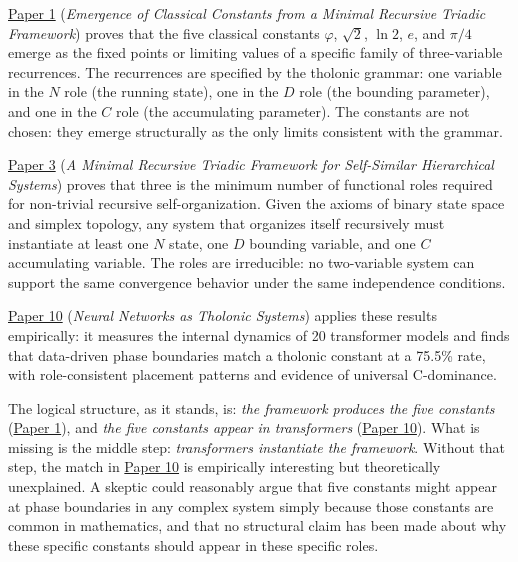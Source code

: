 \documentclass[
  11pt,
  letterpaper,
]{article}
\begin{document}
\href{https://github.com/baardev/truevalue/blob/main/docnav/Research/papers/1_recursive-tholonic-five-constants/1_recursive-tholonic-five-constants.pdf}{Paper
1} (\emph{Emergence of Classical Constants from a Minimal Recursive
Triadic Framework}) proves that the five classical constants
\(\varphi\), \(\sqrt{2}\), \(\ln 2\), \(e\), and \(\pi/4\) emerge as the
fixed points or limiting values of a specific family of three-variable
recurrences. The recurrences are specified by the tholonic grammar: one
variable in the \(N\) role (the running state), one in the \(D\) role
(the bounding parameter), and one in the \(C\) role (the accumulating
parameter). The constants are not chosen: they emerge structurally as
the only limits consistent with the grammar.

\href{https://github.com/baardev/truevalue/blob/main/docnav/Research/papers/3_minimal-recursive-triadic-framework/3_minimal-recursive-triadic-framework.pdf}{Paper
3} (\emph{A Minimal Recursive Triadic Framework for Self-Similar
Hierarchical Systems}) proves that three is the minimum number of
functional roles required for non-trivial recursive self-organization.
Given the axioms of binary state space and simplex topology, any system
that organizes itself recursively must instantiate at least one \(N\)
state, one \(D\) bounding variable, and one \(C\) accumulating variable.
The roles are irreducible: no two-variable system can support the same
convergence behavior under the same independence conditions.

\href{https://github.com/baardev/truevalue/blob/main/docnav/Research/papers/10_tholonic-neural-architecture/10_tholonic-neural-architecture.pdf}{Paper
10} (\emph{Neural Networks as Tholonic Systems}) applies these results
empirically: it measures the internal dynamics of 20 transformer models
and finds that data-driven phase boundaries match a tholonic constant at
a 75.5\% rate, with role-consistent placement patterns and evidence of
universal C-dominance.

The logical structure, as it stands, is: \emph{the framework produces
the five constants}
(\href{https://github.com/baardev/truevalue/blob/main/docnav/Research/papers/1_recursive-tholonic-five-constants/1_recursive-tholonic-five-constants.pdf}{Paper
1}), and \emph{the five constants appear in transformers}
(\href{https://github.com/baardev/truevalue/blob/main/docnav/Research/papers/10_tholonic-neural-architecture/10_tholonic-neural-architecture.pdf}{Paper
10}). What is missing is the middle step: \emph{transformers instantiate
the framework}. Without that step, the match in
\href{https://github.com/baardev/truevalue/blob/main/docnav/Research/papers/10_tholonic-neural-architecture/10_tholonic-neural-architecture.pdf}{Paper
10} is empirically interesting but theoretically unexplained. A skeptic
could reasonably argue that five constants might appear at phase
boundaries in any complex system simply because those constants are
common in mathematics, and that no structural claim has been made about
why these specific constants should appear in these specific roles.
\end{document}
